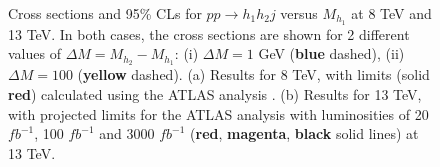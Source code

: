 \documentclass[12pt,a4paper]{article}
\newcommand {\blue} {\color{blue}}
\newcommand {\red} {\color{red}}
\newcommand {\magenta} {\color{Plum}}
\newcommand {\yellow} {\color{NewYellow}}
\providecommand{\DIFaddendFL}{} %
\begin{document}
\begin{figure}[h!]
\DIFaddendFL \centering
\caption{Cross sections and 95\% CLs for $pp \to h_1 h_2 j$ versus $M_{h_1}$ at 8 TeV and 13 TeV. In both cases, the cross sections are shown for 2 different values of $\Delta M = M_{h_2} - M_{h_1}$: (i) $\Delta M = 1$ GeV ({\bf \blue blue} dashed), (ii) $\Delta M = 100$ ({\bf \yellow yellow} dashed). (a) Results for 8 TeV, with limits (solid {\bf \red red}) calculated using the ATLAS analysis \cite{Aad:2015zva}. (b) Results for 13 TeV, with projected limits for the ATLAS analysis \cite{Aad:2015zva} with luminosities of 20 $fb^{-1}$, 100 $fb^{-1}$ and 3000 $fb^{-1}$ ({\bf \red red}, {\bf \magenta magenta}, {\bf black} solid lines) at 13 TeV.} \label{cc_limit_h1h2}
\end{figure}
\end{document}
